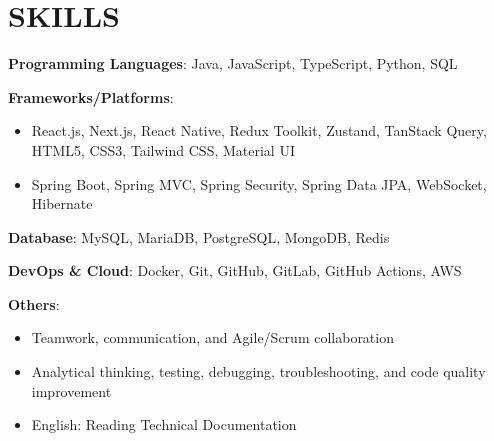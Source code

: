 \section{SKILLS}
\resumeSubHeadingListStart

  \item
    \resumeItemListStart
      \item \textbf{Programming Languages}: Java, JavaScript, TypeScript, Python, SQL
      \item \textbf{Frameworks/Platforms}:
        \begin{itemize}
          \item React.js, Next.js, React Native, Redux Toolkit, Zustand, TanStack Query, HTML5, CSS3, Tailwind CSS, Material UI
          \item Spring Boot, Spring MVC, Spring Security, Spring Data JPA, WebSocket, Hibernate
        \end{itemize}
      \item \textbf{Database}: MySQL, MariaDB, PostgreSQL, MongoDB, Redis
      \item \textbf{DevOps \& Cloud}: Docker, Git, GitHub, GitLab, GitHub Actions, AWS
      \item \textbf{Others}:
        \begin{itemize}
          \item Teamwork, communication, and Agile/Scrum collaboration
          \item Analytical thinking, testing, debugging, troubleshooting, and code quality improvement
          \item English: Reading Technical Documentation
        \end{itemize}
    \resumeItemListEnd

\resumeSubHeadingListEnd
